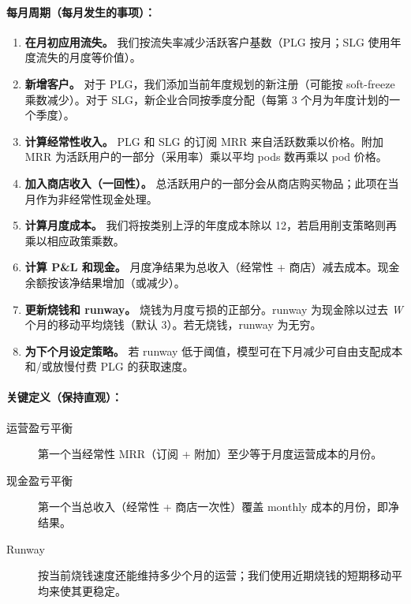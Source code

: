 \documentclass[11pt, a4paper, oneside]{article}
\begin{document}
\paragraph{每月周期（每月发生的事项）：}
\begin{enumerate}
\item \textbf{在月初应用流失。} 我们按流失率减少活跃客户基数（PLG 按月；SLG 使用年度流失的月度等价值）。
\item \textbf{新增客户。} 对于 PLG，我们添加当前年度规划的新注册（可能按 soft-freeze 乘数减少）。对于 SLG，新企业合同按季度分配（每第 3 个月为年度计划的一个季度）。
\item \textbf{计算经常性收入。} PLG 和 SLG 的订阅 MRR 来自活跃数乘以价格。附加 MRR 为活跃用户的一部分（采用率）乘以平均 pods 数再乘以 pod 价格。
\item \textbf{加入商店收入（一回性）。} 总活跃用户的一部分会从商店购买物品；此项在当月作为非经常性现金处理。
\item \textbf{计算月度成本。} 我们将按类别上浮的年度成本除以 12，若启用削支策略则再乘以相应政策乘数。
\item \textbf{计算 P\&L 和现金。} 月度净结果为总收入（经常性 + 商店）减去成本。现金余额按该净结果增加（或减少）。
\item \textbf{更新烧钱和 runway。} 烧钱为月度亏损的正部分。runway 为现金除以过去 \emph{W} 个月的移动平均烧钱（默认 3）。若无烧钱，runway 为无穷。
\item \textbf{为下个月设定策略。} 若 runway 低于阈值，模型可在下月减少可自由支配成本和/或放慢付费 PLG 的获取速度。
\end{enumerate}


\paragraph{关键定义（保持直观）：}
\begin{description}
\item[运营盈亏平衡] 第一个当经常性 MRR（订阅 + 附加）至少等于月度运营成本的月份。
\item[现金盈亏平衡] 第一个当总收入（经常性 + 商店一次性）覆盖 mon\-th\-ly 成本的月份，即净结果。
\item[Runway] 按当前烧钱速度还能维持多少个月的运营；我们使用近期烧钱的短期移动平均来使其更稳定。
\end{description}
\end{document}
